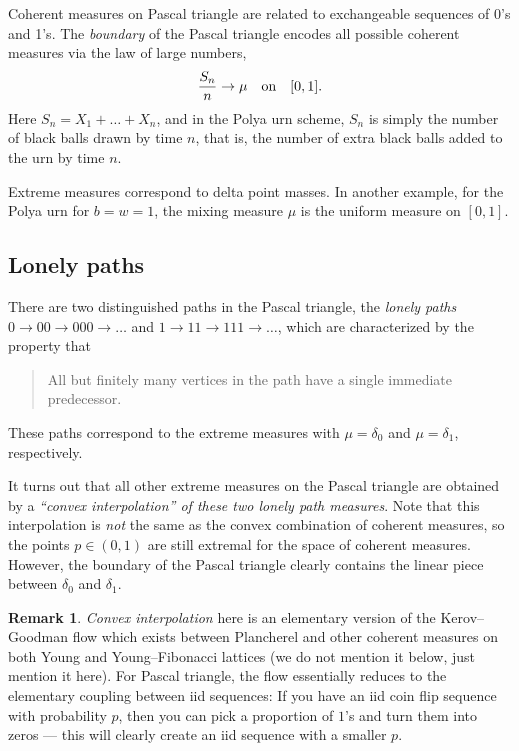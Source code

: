 \documentclass[letterpaper,11pt,oneside,reqno]{article}
\numberwithin{equation}{section}
\theoremstyle{definition}
\newtheorem{remark}[proposition]{Remark}
\begin{document}
Coherent measures on Pascal triangle are related to exchangeable
sequences of 0's and 1's. The \emph{boundary} of the Pascal
triangle encodes all possible coherent measures via the law of large numbers,
\begin{equation*}
	\frac{S_n}{n}\to \mu \quad \textnormal{on} \quad [0,1].
\end{equation*}
Here
$S_n=X_1+\ldots+X_n$, 
and in the Polya urn scheme, 
$S_n$ is simply the
number of black balls drawn by time $n$,
that is, the number of extra black balls added to the urn
by time $n$.

Extreme measures correspond to delta point masses.
In another example, for the Polya urn for $b=w=1$, the mixing measure $\mu$ is the
uniform measure on $[0,1]$.

\subsection{Lonely paths}

There are two distinguished paths in the Pascal triangle, the
\emph{lonely paths} $0\to00\to000\to\ldots $
and
$1\to 11\to111\to\ldots $, which are characterized by the
property that \cite{KerovGoodman1997}
\begin{quote}
	All but finitely many vertices in the path have a single immediate predecessor.
\end{quote}
These paths correspond to the extreme measures
with $\mu=\delta_0$ and $\mu=\delta_1$, respectively.

It turns out that all other extreme measures on the Pascal triangle
are obtained by a \emph{``convex interpolation'' of these two lonely path measures}.
Note that this interpolation is \emph{not} the same as the convex combination
of coherent measures, so the points $p\in(0,1)$ are still extremal
for the space of coherent measures. However, the boundary
of the Pascal triangle clearly contains the linear
piece between $\delta_0$ and $\delta_1$.

\begin{remark}
	\emph{Convex interpolation} here is an elementary version of the 
	Kerov--Goodman flow \cite{KerovGoodman1997}
	which exists between Plancherel and other coherent measures on both 
	Young and Young--Fibonacci lattices (we do not mention it below, just mention it here).
	For Pascal triangle, the flow essentially reduces to the elementary coupling between iid sequences:
	If you have an iid coin flip sequence with probability $p$, then you can pick a proportion of $1$'s and turn them
	into zeros --- this will clearly create an iid sequence with a smaller $p$.
\end{remark}
\end{document}
